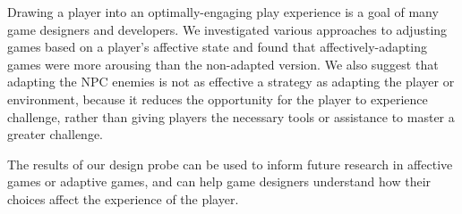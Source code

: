 
Drawing a player into an optimally-engaging play experience is a goal of many game designers and developers. We investigated various approaches to adjusting games based on a player’s affective state and found that affectively-adapting games were more arousing than the non-adapted version. We also suggest that adapting the NPC enemies is not as effective a strategy as adapting the player or environment, because it reduces the opportunity for the player to experience challenge, rather than giving players the necessary tools or assistance to master a greater challenge.

The results of our design probe can be used to inform future research in affective games or adaptive games, and can help game designers understand how their choices affect the experience of the player.
